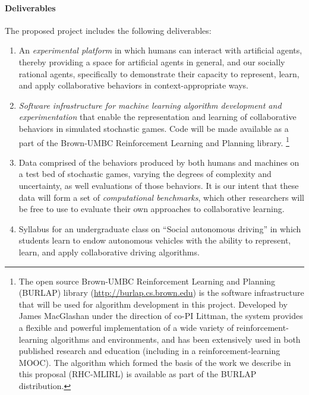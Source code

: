 
\vspace{\up}
\paragraph{Deliverables}

The proposed project includes the following deliverables: 

\begin{enumerate}

\item An {\em experimental platform\/} in which humans can interact
  with artificial agents, thereby providing a space for artificial
  agents in general, and our socially rational agents, specifically to
  demonstrate their capacity to represent, learn, and apply
  collaborative behaviors in context-appropriate ways.

\item {\em Software infrastructure for machine learning algorithm
  development and experimentation\/} that enable the representation
  and learning of collaborative behaviors in simulated stochastic games.
  Code will be made available as a part of the Brown-UMBC
  Reinforcement Learning and Planning library.%
\footnote{The open source Brown-UMBC Reinforcement Learning and
  Planning (BURLAP) library (\url{http://burlap.cs.brown.edu}) is the
  software infrastructure that will be used for algorithm development
  in this project.  Developed by James MacGlashan under the direction
  of co-PI Littman, the system provides a flexible and powerful
  implementation of a wide variety of reinforcement-learning
  algorithms and environments, and has been extensively used in both
  published research and education (including in a
  reinforcement-learning MOOC).  The algorithm which formed the basis
  of the work we describe in this proposal (RHC-MLIRL) is available as
  part of the BURLAP distribution.}

\item Data comprised of the behaviors produced by both humans and
  machines on a test bed of stochastic games, varying the degrees of
  complexity and uncertainty, as well evaluations of those behaviors.
  It is our intent that these data will form a set of {\em
    computational benchmarks}, which other researchers will be free to
  use to evaluate their own approaches to collaborative learning.

\item Syllabus for an undergraduate class on ``Social autonomous
  driving'' in which students learn to endow autonomous vehicles with
  the ability to represent, learn, and apply collaborative driving
  algorithms.

\end{enumerate}

